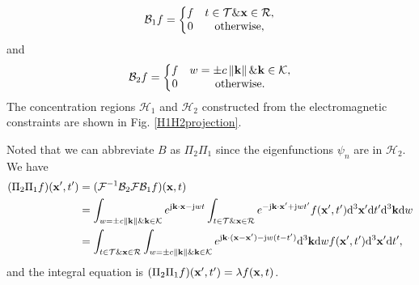 \documentclass[12pt,draftclsnofoot,journal,onecolumn]{IEEEtran}
\begin{document}
	\begin{equation}
		\begin{aligned}
			\mathcal{B}_1 f = \left\{\begin{matrix}
			f	&  t\in \mathcal{T} \& {\bf x} \in \mathcal{R},  \\
			0	&  {\rm otherwise},
			\end{matrix}\right.
		\end{aligned}
	\end{equation}
	and
		\begin{equation}
		\begin{aligned}
			\mathcal{B}_2 f = \left\{\begin{matrix}
				f	&  w= \pm c \left\| {\bf k} \right\| \& {\bf k} \in \mathcal{K},  \\
				0	&  {\rm otherwise}.
			\end{matrix}\right.
		\end{aligned}
	\end{equation}
	The concentration regions $\mathcal{H}_1$ and $\mathcal{H}_2$ constructed from the electromagnetic constraints are shown in Fig. \ref{H1H2projection}.
	
	Noted that we can abbreviate $B$ as $\Pi_2 \Pi_1$ since the eigenfunctions $\psi_n$ are in $\mathcal{H}_2$. We have 
	\begin{equation}
		\begin{aligned}
		(\Pi_2 \Pi_1 f)({\bf x}',t') &=  (\mathcal{F}^{-1} \mathcal{B}_2 \mathcal{F} \mathcal{B}_1f)({\bf x},t)
		\\& = \int_{w= \pm c \left\| {\bf k} \right\| \& {\bf k} \in \mathcal{K}} e^{{\rm j}{\bf k}\cdot{\bf x}-{\rm j}wt} \int_{t\in \mathcal{T} \& {\bf x} \in \mathcal{R}} e^{-{\rm j}{\bf k}\cdot {\bf x}'+{\rm j}wt' } f({\bf x}',t'){\rm d}^3{\bf x}'{\rm d}t' {\rm d}^3{\bf k}{\rm d}w
		\\& = \int_{t\in \mathcal{T} \& {\bf x} \in \mathcal{R}}  \int_{w= \pm c \left\| {\bf k} \right\| \& {\bf k} \in \mathcal{K}} e^{{\rm j}{\bf k}\cdot({\bf x}-{\bf x}')-{\rm j}w(t-t')}
		 {\rm d}^3{\bf k}{\rm d}w f({\bf x}',t'){\rm d}^3{\bf x}'{\rm d}t',
		\end{aligned}
	\end{equation}
	and the integral equation is $(\Pi_2 \Pi_1 f)({\bf x}',t') = \lambda f({\bf x},t)$.
	
\end{document}
